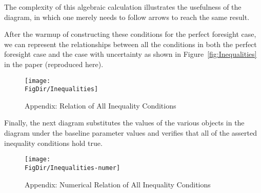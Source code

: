 \documentclass[\econtexRoot/BufferStockTheory]{subfiles}
\begin{document}
The complexity of this algebraic calculation illustrates the usefulness of the diagram, in which one merely needs to follow arrows to reach the same result.

After the warmup of constructing these conditions for the perfect foresight case, we can represent the relationships between all the conditions in both the perfect foresight case and the case with uncertainty as shown in Figure~\ref{fig:Inequalities} in the paper (reproduced here).

\begin{figure}[ht]
  \centerline{
    \texttt{[image: \\FigDir/Inequalities]}
  }
  \caption{Appendix: Relation of All Inequality Conditions}\label{fig:InequalitiesApp}
\end{figure}

Finally, the next diagram substitutes the values of the various objects in the diagram under the baseline parameter values and verifies that all of the asserted inequality conditions hold true.
\begin{figure}[ht]
  \centerline{
    \texttt{[image: \\FigDir/Inequalities-numer]}
  }
  \caption{Appendix: Numerical Relation of All Inequality Conditions}\label{fig:InequalitiesAppNumer}
\end{figure}


\ifSubfilesClassLoaded{\bibfilesfind{\texname}}{}
\end{document}
